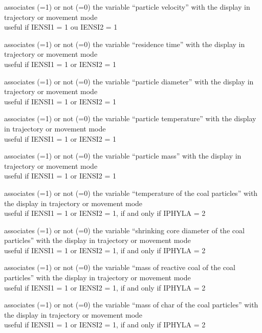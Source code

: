 {associates (=1) or not (=0) the variable ``particle velocity''
with the display in trajectory or movement mode\\
useful if IENSI1 = 1 ou IENSI2 = 1}

{associates (=1) or not (=0) the variable ``residence time''
with the display in trajectory or movement mode\\
useful if IENSI1 = 1 or IENSI2 = 1}

{associates (=1) or not (=0) the variable ``particle diameter''
with the display in trajectory or movement mode\\
useful if IENSI1 = 1 or IENSI2 = 1}

{associates (=1) or not (=0) the variable ``particle temperature''
with the display in trajectory or movement mode\\
useful if IENSI1 = 1 or IENSI2 = 1}

{associates (=1) or not (=0) the variable ``particle mass''
with the display in trajectory or movement mode\\
useful if IENSI1 = 1 or IENSI2 = 1}

{associates (=1) or not (=0) the variable ``temperature of the coal particles''
with the display in trajectory or movement mode\\
useful if IENSI1 = 1 or IENSI2 = 1, if and only if IPHYLA = 2}

{associates (=1) or not (=0) the variable ``shrinking core diameter of
the coal particles'' with the display in trajectory or movement mode\\
useful if IENSI1 = 1 or IENSI2 = 1, if and only if IPHYLA = 2}

{associates (=1) or not (=0) the variable ``mass of reactive coal of the
coal particles'' with the display in trajectory or movement mode\\
useful if IENSI1 = 1 or IENSI2 = 1, if and only if IPHYLA = 2}

{associates (=1) or not (=0) the variable ``mass of char of the
coal particles'' with the display in trajectory or movement mode\\
useful if IENSI1 = 1 or IENSI2 = 1, if and only if IPHYLA = 2}

